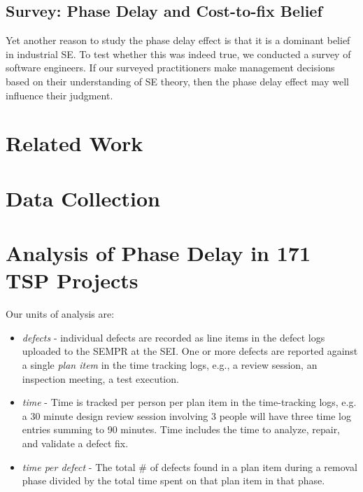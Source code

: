 \documentclass{sig-alternate}
\newcommand{\bi}{\begin{itemize}}%
\newcommand{\ei}{\end{itemize}}
\begin{document}
\subsection{Survey:  Phase Delay and Cost-to-fix Belief}\label{survey} 
Yet another reason to study the phase delay effect is that it is a dominant belief in industrial SE.
To test whether this was indeed true, we conducted a survey of software engineers. If our surveyed practitioners make management decisions based on their
understanding of SE theory, then the phase delay effect may well influence their judgment.



\section{Related Work}
 










%

 

\section{Data Collection}










\section{Analysis of Phase Delay in 171 TSP Projects}
Our units of analysis are:
\bi
    \item \emph{defects} - individual defects are recorded as line items in the defect logs uploaded to the SEMPR at the SEI. One or more defects are reported against a single \emph{plan item} in the time tracking logs, e.g., a review session, an inspection meeting, a test execution.
    \item \emph{time} - Time is tracked per person per plan item in the time-tracking logs, e.g. a 30 minute design review session involving 3 people will have three time log entries summing to 90 minutes. Time includes the time to analyze, repair, and validate a defect fix.
    \item \emph{time per defect} - The total \# of defects found in a plan item during a removal phase divided by the total time spent on that plan item in that phase.
\ei
\end{document}

